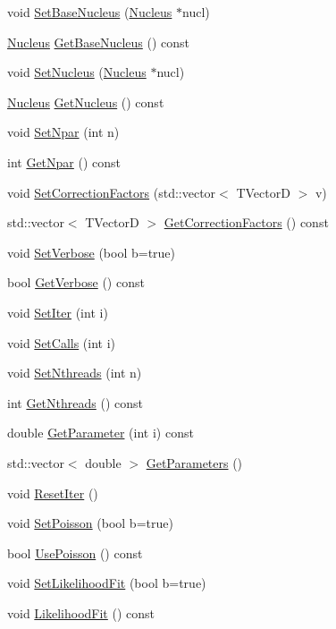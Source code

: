 \begin{DoxyCompactItemize}
\item 
void \hyperlink{classCoulExMinFCN_a3924912b5a05cb7966a569e11a6ab912}{Set\-Base\-Nucleus} (\hyperlink{classNucleus}{Nucleus} $\ast$nucl)
\item 
\hyperlink{classNucleus}{Nucleus} \hyperlink{classCoulExMinFCN_aca08dec223253bd86022ebf5358d837a}{Get\-Base\-Nucleus} () const 
\item 
void \hyperlink{classCoulExMinFCN_a4154d0ca6197aff0c360a18b846718bf}{Set\-Nucleus} (\hyperlink{classNucleus}{Nucleus} $\ast$nucl)
\item 
\hyperlink{classNucleus}{Nucleus} \hyperlink{classCoulExMinFCN_a04819cb7504e0d38a530923c3a9cdb87}{Get\-Nucleus} () const 
\item 
void \hyperlink{classCoulExMinFCN_aa7a93d1dbdf39271e8e7f1aedbbda147}{Set\-Npar} (int n)
\item 
int \hyperlink{classCoulExMinFCN_a558a013938717c422f66a9a955d78662}{Get\-Npar} () const 
\item 
void \hyperlink{classCoulExMinFCN_a6525e186ee14702162701414cda80fe1}{Set\-Correction\-Factors} (std\-::vector$<$ T\-Vector\-D $>$ v)
\item 
std\-::vector$<$ T\-Vector\-D $>$ \hyperlink{classCoulExMinFCN_a457c6cf81ad161d18c13e8bacd087a4a}{Get\-Correction\-Factors} () const 
\item 
void \hyperlink{classCoulExMinFCN_a04926d8c95503585735f0f79337376d1}{Set\-Verbose} (bool b=true)
\item 
bool \hyperlink{classCoulExMinFCN_acac974995031dd144882caee327f0284}{Get\-Verbose} () const 
\item 
void \hyperlink{classCoulExMinFCN_a4b5d3d75267cc59035d6697fceb3e8d3}{Set\-Iter} (int i)
\item 
void \hyperlink{classCoulExMinFCN_a70d61db9a8a7fee17671b637b3c0dee7}{Set\-Calls} (int i)
\item 
void \hyperlink{classCoulExMinFCN_a8fd85057cc72d10486ea25de6d37aa3d}{Set\-Nthreads} (int n)
\item 
int \hyperlink{classCoulExMinFCN_aee492209717d0c852ce0093a8f45b1d9}{Get\-Nthreads} () const 
\item 
double \hyperlink{classCoulExMinFCN_aa588591bbc923ab42070b42b74c1dfc8}{Get\-Parameter} (int i) const 
\item 
std\-::vector$<$ double $>$ \hyperlink{classCoulExMinFCN_ac49f8e36a62aac46b1300eca173f486f}{Get\-Parameters} ()
\item 
void \hyperlink{classCoulExMinFCN_ad15983e7cecf6fb939c55d47b2a9e700}{Reset\-Iter} ()
\item 
void \hyperlink{classCoulExMinFCN_a96c96926312d6e52c797274035410894}{Set\-Poisson} (bool b=true)
\item 
bool \hyperlink{classCoulExMinFCN_a076212903b18324a472ef11310bf8fc3}{Use\-Poisson} () const 
\item 
void \hyperlink{classCoulExMinFCN_a17f18c83c3a60c89e038f91b946c495d}{Set\-Likelihood\-Fit} (bool b=true)
\item 
void \hyperlink{classCoulExMinFCN_a7e9b3f67a357db9577c9b283e1afe57d}{Likelihood\-Fit} () const 
\end{DoxyCompactItemize}


